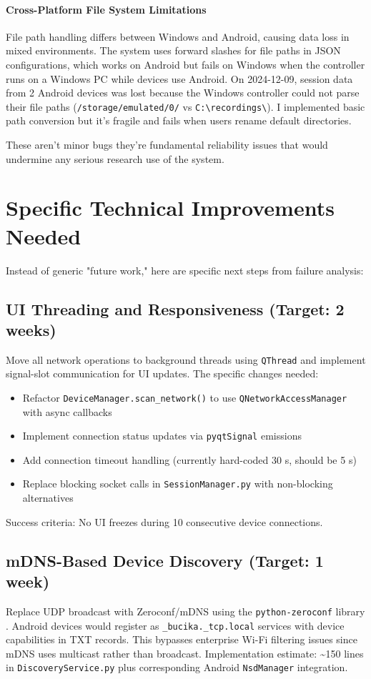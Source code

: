 \paragraph{\textbf{Cross-Platform File System Limitations}} File path handling differs between Windows and Android, causing data loss in mixed environments. The system uses forward slashes for file paths in JSON configurations, which works on Android but fails on Windows when the controller runs on a Windows PC while devices use Android. On 2024-12-09, session data from 2 Android devices was lost because the Windows controller could not parse their file paths (\verb|/storage/emulated/0/| vs \verb|C:\recordings\|). I implemented basic path conversion but it's fragile and fails when users rename default directories.

These aren't minor bugs \textemdash they're fundamental reliability issues that would undermine any serious research
use of the system.


\section{Specific Technical Improvements Needed}

Instead of generic "future work," here are specific next steps from failure analysis:

\subsection{UI Threading and Responsiveness (Target: 2 weeks)}
Move all network operations to background threads using \texttt{QThread} and implement signal-slot communication for UI updates. The specific changes needed:
\begin{itemize}
	\item Refactor \texttt{DeviceManager.scan\_network()} to use \texttt{QNetworkAccessManager} with async callbacks
	\item Implement connection status updates via \texttt{pyqtSignal} emissions
	\item Add connection timeout handling (currently hard-coded 30 s, should be 5 s)
	\item Replace blocking socket calls in \texttt{SessionManager.py} with non-blocking alternatives
\end{itemize}
Success criteria: No UI freezes during 10 consecutive device connections.

\subsection{mDNS-Based Device Discovery (Target: 1 week)}
Replace UDP broadcast with Zeroconf/mDNS using the \texttt{python-zeroconf} library \cite{ref19}. Android devices would register as \texttt{\_bucika.\_tcp.local} services with device capabilities in TXT records. This bypasses enterprise Wi-Fi filtering issues since mDNS uses multicast rather than broadcast. Implementation estimate: \textasciitilde{}150 lines in \texttt{DiscoveryService.py} plus corresponding Android \texttt{NsdManager} integration.

